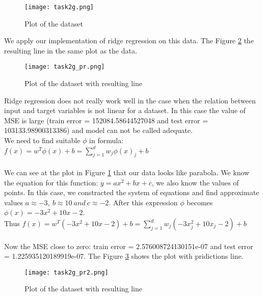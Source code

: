 \documentclass[a4paper, twoside, english]{article}
\begin{document}
\begin{figure}[h!]
	\centerline{\texttt{[image: task2g.png]}}
	\caption[task2g]{Plot of the dataset }
	\label{fig:task2g}
\end{figure}
We apply our implementation of ridge regression on this data. The Figure \ref{fig:task2g_pr} the resulting line in the same plot as the data.\\
\begin{figure}[h!]
	\centerline{\texttt{[image: task2g\_pr.png]}}
	\caption[task2g]{Plot of the dataset with resulting line}
	\label{fig:task2g_pr}
\end{figure}
\newpage

Ridge regression does not really work well in the case when the relation between input and target variables is not linear for a dataset. In this case the value of MSE is large (train error = 152084.58644527048 and test error = 103133.98900313386) and model can not be called adequate.\\
We need to find suitable $\phi$ in formula:
$f(x)=w^T\phi(x)+b=\sum\limits_{j=1}^d w_j \phi(x)_j+b $
~\\
~\\
We can see at the plot in Figure \ref{fig:task2g} that our data looks like parabola. We know the equation for this function: $y=ax^2+bx+c$, we also know the values of points. In this case, we constracted the system of equations and find approximate values $a\approx-3,\ b\approx10\ and\ c\approx-2$. After this expression $\phi$ becomes $\phi(x)=-3x^2+10x-2$.\\
Thus $f(x)=w^T(-3x^2+10x-2)+b=\sum\limits_{j=1}^d w_j (-3x_j^2+10x_j-2)+b $
~\\
~\\
Now the MSE close to zero: train error = 2.576008724130151e-07 and test error = 1.225935120189919e-07. The Figure \ref{fig:task2g_pr2} shows the plot with pridictions line.
\begin{figure}[h!]
	\centerline{\texttt{[image: task2g\_pr2.png]}}
	\caption[task2g]{Plot of the dataset with resulting line}
	\label{fig:task2g_pr2}
\end{figure}




\end{document}
